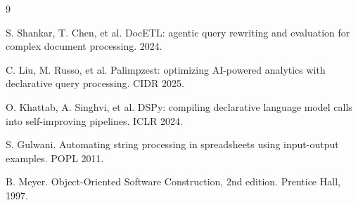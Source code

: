 \documentclass[9pt]{extarticle}
\begin{document}
{\small
\begin{thebibliography}{9}

 S. Shankar, T. Chen, et al. DocETL: agentic query rewriting
and evaluation for complex document processing. 2024.

 C. Liu, M. Russo, et al. Palimpzest: optimizing
AI-powered analytics with declarative query processing. CIDR 2025.

 O. Khattab, A. Singhvi, et al. DSPy: compiling declarative
language model calls into self-improving pipelines. ICLR 2024.

 S. Gulwani. Automating string processing in spreadsheets
using input-output examples. POPL 2011.

 B. Meyer. Object-Oriented Software Construction, 2nd
edition. Prentice Hall, 1997.

\end{thebibliography}
}
\end{document}
